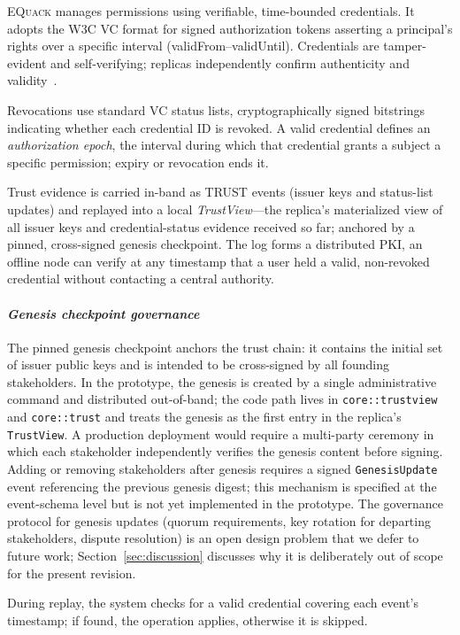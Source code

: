 \documentclass[10pt,journal,compsoc]{IEEEtran}
\newcommand{\equack}{\textsc{EQuack}}
\begin{document}
\equack{} manages permissions using verifiable, time-bounded credentials. It adopts the W3C VC format for signed authorization tokens asserting a principal's rights over a specific interval (validFrom--validUntil). Credentials are tamper-evident and self-verifying; replicas independently confirm authenticity and validity~\cite{w3c_vc_2024}.

Revocations use standard VC status lists, cryptographically signed bitstrings indicating whether each credential ID is revoked. A valid credential defines an \emph{authorization epoch}, the interval during which that credential grants a subject a specific permission; expiry or revocation ends it.

Trust evidence is carried in-band as TRUST events (issuer keys and status-list updates) and replayed into a local \emph{TrustView}---the replica's materialized view of all issuer keys and credential-status evidence received so far; anchored by a pinned, cross-signed genesis checkpoint. The log forms a distributed PKI, an offline node can verify at any timestamp that a user held a valid, non-revoked credential without contacting a central authority.

\paragraph*{\textit{\textbf{Genesis checkpoint governance}}}
The pinned genesis checkpoint anchors the trust chain: it
contains the initial set of issuer public keys and is intended to
be cross-signed by all founding stakeholders. In the prototype,
the genesis is created by a single administrative command and
distributed out-of-band; the code path lives in \texttt{core::trustview}
and \texttt{core::trust} and treats the genesis as the first entry
in the replica's \texttt{TrustView}. A production deployment would
require a multi-party ceremony in which each stakeholder
independently verifies the genesis content before signing. Adding
or removing stakeholders after genesis requires a signed
\texttt{GenesisUpdate} event referencing the previous genesis
digest; this mechanism is specified at the event-schema level but
is not yet implemented in the prototype.
The governance protocol for genesis updates (quorum requirements,
key rotation for departing stakeholders, dispute resolution) is
an open design problem that we defer to future work; Section~\ref{sec:discussion}
discusses why it is deliberately out of scope for the present
revision.

During replay, the system checks for a valid credential covering each event's timestamp; if found, the operation applies, otherwise it is skipped.
\end{document}
